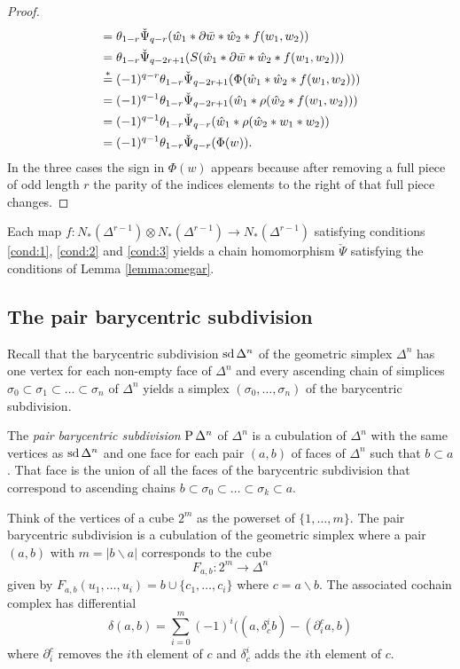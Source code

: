 \begin{proof}
\begin{align*}
		&= \theta_{1-r}\check{\Psi}_{q-r}(\hat{w}_1*\partial\bar{w}*\hat{w}_2*f(w_1,w_2)) \\
		&= \theta_{1-r}\check{\Psi}_{q-2r+1}(S(\hat{w}_1*\partial\bar{w}*\hat{w}_2*f(w_1,w_2)))\\
	    &\overset{*}{=} (-1)^{q-r} \theta_{1-r}\check{\Psi}_{q-2r+1}(\Phi(\hat{w}_1*\hat{w}_2*f(w_1,w_2))) \\
		&= (-1)^{q-1} \theta_{1-r}\check{\Psi}_{q-2r+1}(\hat{w}_1*\rho(\hat{w}_2*f(w_1,w_2)))\\
		&= (-1)^{q-1} \theta_{1-r}\check{\Psi}_{q-r}(\hat{w}_1*\rho(\hat{w}_2*w_1*w_2))\\
		&= (-1)^{q-1}\theta_{1-r}\check{\Psi}_{q-r}(\Phi(w)). \qedhere
	\end{align*}
In the three cases the sign in $\Phi(w)$ appears because after removing a full piece of odd length $r$ the parity of the indices elements to the right of that full piece changes.
\end{proof}

\begin{corollary} Each map $f\colon N_*(\Delta^{r-1})\otimes N_*(\Delta^{r-1})\to N_*(\Delta^{r-1})$ satisfying conditions \eqref{cond:1}, \eqref{cond:2} and \eqref{cond:3} yields a chain homomorphism $\check{\Psi}$ satisfying the conditions of Lemma \ref{lemma:omegar}.
\end{corollary}

\subsection{The pair barycentric subdivision} Recall that the barycentric subdivision $\operatorname{sd} \Delta^n$ of the geometric simplex $\Delta^n$ has one vertex for each non-empty face of $\Delta^n$ and every ascending chain of simplices $\sigma_0\subset \sigma_1\subset\ldots \subset \sigma_n$ of $\Delta^n$ yields a simplex $(\sigma_0,\ldots,\sigma_n)$ of the barycentric subdivision.

The \emph{pair barycentric subdivision} $\operatorname{P} \Delta^n$ of $\Delta^n$ is a cubulation of $\Delta^n$ with the same vertices as $\operatorname{sd} \Delta^n$ and one face for each pair $(a,b)$ of faces of $\Delta^n$ such that $b\subset a$. That face is the union of all the faces of the barycentric subdivision that correspond to ascending chains $b\subset \sigma_0\subset \ldots\subset \sigma_k\subset a$.

Think of the vertices of a cube $2^m$ as the powerset of $\{1,\ldots,m\}$. The pair barycentric subdivision is a cubulation of the geometric simplex where a pair $(a,b)$ with $m=|b\smallsetminus a|$ corresponds to the cube
\[F_{a,b}\colon 2^{m}\to \Delta^n\]
given by $F_{a,b}(u_1,\ldots,u_i) = b\cup \{c_1,\ldots,c_i\}$ where $c=a\smallsetminus b$. The associated cochain complex has differential
\[\delta(a,b) = \sum_{i=0}^m (-1)^i((a,\delta^i_c b)-(\partial^c_i a,b)\]
where $\partial_i^c$ removes the $i$th element of $c$ and $\delta^i_c$ adds the $i$th element of $c$.


